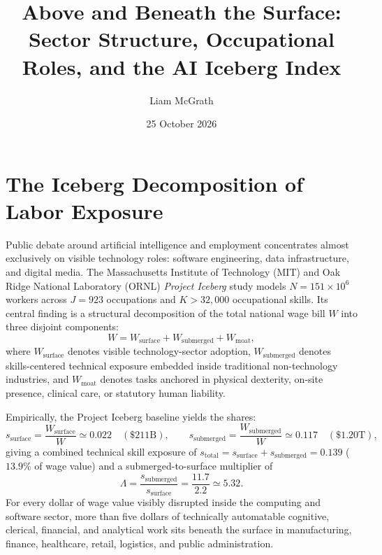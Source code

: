 \documentclass[11pt]{article}
\title{Above and Beneath the Surface: Sector Structure, Occupational Roles, and the AI Iceberg Index}
\author{Liam McGrath}
\date{25 October 2026}
\begin{document}
\maketitle
\tableofcontents

\section{The Iceberg Decomposition of Labor Exposure}
\label{sec:iceberg-model}
Public debate around artificial intelligence and employment concentrates almost exclusively on visible technology roles: software engineering, data infrastructure, and digital media. The Massachusetts Institute of Technology (MIT) and Oak Ridge National Laboratory (ORNL) \textit{Project Iceberg} study models $N = 151\times 10^6$ workers across $J = 923$ occupations and $K > 32{,}000$ occupational skills. Its central finding is a structural decomposition of the total national wage bill $W$ into three disjoint components:
\begin{equation}
W = W_{\text{surface}} + W_{\text{submerged}} + W_{\text{moat}},
\label{eq:wage-split}
\end{equation}
where $W_{\text{surface}}$ denotes visible technology-sector adoption, $W_{\text{submerged}}$ denotes skills-centered technical exposure embedded inside traditional non-technology industries, and $W_{\text{moat}}$ denotes tasks anchored in physical dexterity, on-site presence, clinical care, or statutory human liability.

Empirically, the Project Iceberg baseline yields the shares:
\begin{equation}
s_{\text{surface}} = \frac{W_{\text{surface}}}{W} \simeq 0.022 \quad (\$211\text{B}), \qquad
s_{\text{submerged}} = \frac{W_{\text{submerged}}}{W} \simeq 0.117 \quad (\$1.20\text{T}),
\label{eq:iceberg-shares}
\end{equation}
giving a combined technical skill exposure of $s_{\text{total}} = s_{\text{surface}} + s_{\text{submerged}} = 0.139$ ($13.9\%$ of wage value) and a submerged-to-surface multiplier of
\begin{equation}
\Lambda = \frac{s_{\text{submerged}}}{s_{\text{surface}}} = \frac{11.7}{2.2} \simeq 5.32.
\label{eq:iceberg-ratio}
\end{equation}
For every dollar of wage value visibly disrupted inside the computing and software sector, more than five dollars of technically automatable cognitive, clerical, financial, and analytical work sits beneath the surface in manufacturing, finance, healthcare, retail, logistics, and public administration.
\end{document}
